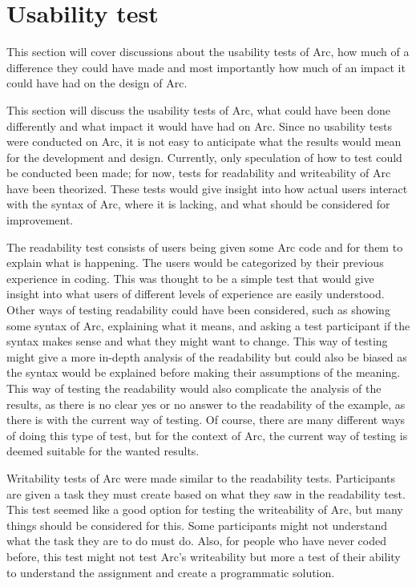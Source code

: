 \section{Usability test}\label{sec:discussion_usabilityTest}

This section will cover discussions about the usability tests of Arc, how much of a difference they could have made and most importantly how much of an impact it could have had on the design of Arc.



This section will discuss the usability tests of Arc, what could have been done differently and what impact it would have had on Arc. Since no usability tests were conducted on Arc, it is not easy to anticipate what the results would mean for the development and design. Currently, only speculation of how to test could be conducted been made; for now, tests for readability and writeability of Arc have been theorized. These tests would give insight into how actual users interact with the syntax of Arc, where it is lacking, and what should be considered for improvement. 

The readability test consists of users being given some Arc code and for them to explain what is happening. The users would be categorized by their previous experience in coding. This was thought to be a simple test that would give insight into what users of different levels of experience are easily understood. Other ways of testing readability could have been considered, such as showing some syntax of Arc, explaining what it means, and asking a test participant if the syntax makes sense and what they might want to change. This way of testing might give a more in-depth analysis of the readability but could also be biased as the syntax would be explained before making their assumptions of the meaning. This way of testing the readability would also complicate the analysis of the results, as there is no clear yes or no answer to the readability of the example, as there is with the current way of testing. Of course, there are many different ways of doing this type of test, but for the context of Arc, the current way of testing is deemed suitable for the wanted results.

Writability tests of Arc were made similar to the readability tests. Participants are given a task they must create based on what they saw in the readability test. This test seemed like a good option for testing the writeability of Arc, but many things should be considered for this. Some participants might not understand what the task they are to do must do. Also, for people who have never coded before, this test might not test Arc's writeability but more a test of their ability to understand the assignment and create a programmatic solution. 

